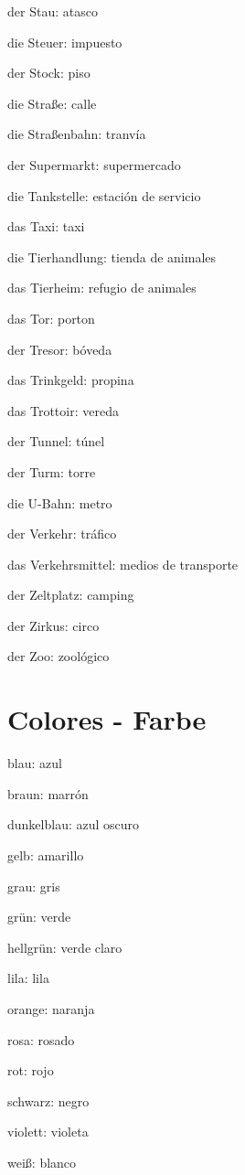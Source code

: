 \begin{multicols}{2}
\begin{myitemize}
\item der Stau: atasco
\item die Steuer: impuesto
\item der Stock: piso
\item die Straße: calle
\item die Straßenbahn: tranvía
\item der Supermarkt: supermercado
\item die Tankstelle: estación de servicio
\item das Taxi: taxi
\item die Tierhandlung: tienda de animales
\item das Tierheim: refugio de animales
\item das Tor: porton
\item der Tresor: bóveda
\item das Trinkgeld: propina
\item das Trottoir: vereda
\item der Tunnel: túnel
\item der Turm: torre
\item die U-Bahn: metro
\item der Verkehr: tráfico
\item das Verkehrsmittel: medios de transporte
\item der Zeltplatz: camping
\item der Zirkus: circo
\item der Zoo: zoológico
\end{myitemize}
\end{multicols}


\section{Colores - Farbe}
\begin{multicols}{3}
\begin{myitemize}
\item blau: azul
\item braun: marrón
\item dunkelblau: azul oscuro
\item gelb: amarillo
\item grau: gris
\item grün: verde
\item hellgrün: verde claro
\item lila: lila
\item orange: naranja
\item rosa: rosado
\item rot: rojo
\item schwarz: negro
\item violett: violeta
\item weiß: blanco
\end{myitemize}
\end{multicols}

